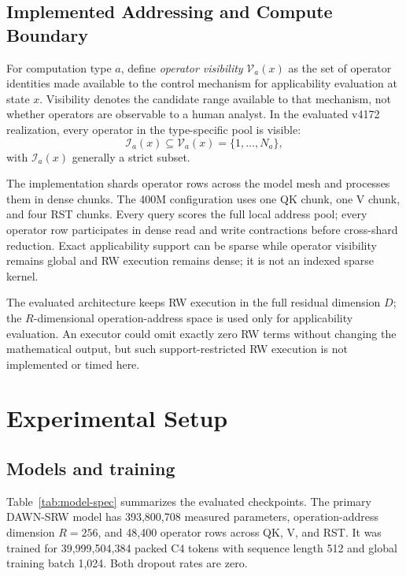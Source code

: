 \documentclass{article}
\newcommand{\DAWN}{DAWN-SRW}
\begin{document}
\subsection{Implemented Addressing and Compute Boundary}
\label{sec:implemented-boundary}

For computation type \(a\), define \emph{operator visibility} \(\mathcal{V}_a(x)\) as the
set of operator identities made available to the control mechanism for
applicability evaluation at state \(x\). Visibility denotes the candidate range
available to that mechanism, not whether operators are observable to a human
analyst. In the evaluated v4172 realization, every operator in the type-specific
pool is visible:
\[
\mathcal{I}_a(x)\subseteq\mathcal{V}_a(x)=\{1,\ldots,N_a\},
\]
with \(\mathcal{I}_a(x)\) generally a strict subset.

The implementation shards operator rows across the model mesh and processes
them in dense chunks. The 400M configuration uses one QK chunk, one V chunk,
and four RST chunks. Every query scores the full local address pool; every
operator row participates in dense read and write contractions before
cross-shard reduction. Exact applicability support can be sparse while operator
visibility remains global and RW execution remains dense; it is not an indexed
sparse kernel.

The evaluated architecture keeps RW execution in the full residual dimension
\(D\); the \(R\)-dimensional operation-address space is used only for
applicability evaluation. An executor could omit exactly zero RW terms without
changing the mathematical output, but such support-restricted RW execution is
not implemented or timed here.

\section{Experimental Setup}
\label{sec:setup}

\subsection{Models and training}

Table~\ref{tab:model-spec} summarizes the evaluated checkpoints. The primary
\DAWN{} model has 393,800,708 measured parameters, operation-address dimension
\(R=256\), and 48,400 operator rows across QK, V, and RST. It was trained for
39,999,504,384 packed C4 tokens with sequence length 512 and global training
batch 1,024. Both dropout rates are zero.
\end{document}
